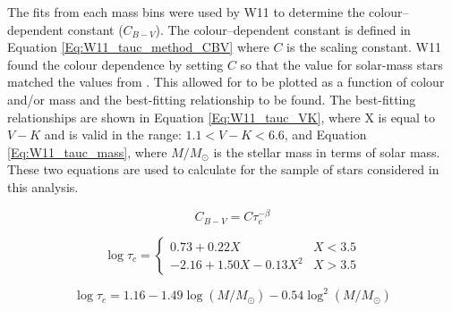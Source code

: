 The fits from each mass bins were used by W11 to determine the colour--dependent constant ($C_{B-V}$). The colour--dependent constant is defined in Equation \ref{Eq:W11_tauc_method_CBV} where $C$ is the scaling constant. W11 found the colour dependence by setting $C$ so that the \tauc value for solar-mass stars matched the values from \citet{Noyes_etal_1984}. This allowed for \tauc to be plotted as a function of colour and/or mass and the best-fitting relationship to be found. The best-fitting relationships are shown in Equation \ref{Eq:W11_tauc_VK}, where X is equal to $V-K$ and is valid in the range: $1.1 < V-K < 6.6$, and Equation \ref{Eq:W11_tauc_mass}, where $M/M_{\odot}$ is the stellar mass in terms of solar mass. These two equations are used to calculate \tauc for the sample of stars considered in this analysis.

\begin{equation}
    C_{B-V} = C\tau_{c}^{-\beta}
    \label{Eq:W11_tauc_method_CBV}
\end{equation}

\begin{equation}
    \log \tau_{c} = 
    \begin{cases}
        0.73 + 0.22X & X < 3.5 \\
        -2.16 +1.50X - 0.13X^{2} & X > 3.5
    \end{cases}
    \label{Eq:W11_tauc_VK}
\end{equation}

\begin{equation}
    \log \tau_{c} = 1.16 - 1.49\log(M/M_{\odot}) - 0.54\log^{2}(M/M_{\odot})
    \label{Eq:W11_tauc_mass}
\end{equation}

